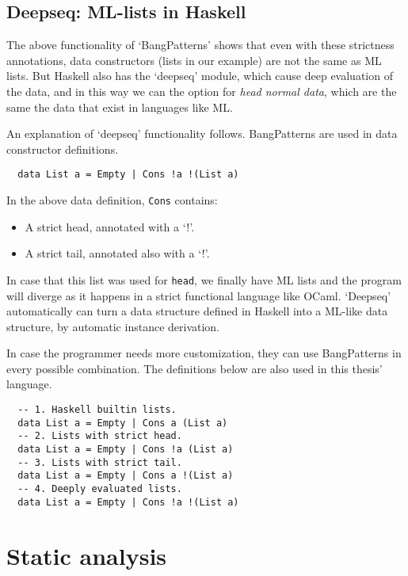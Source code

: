 \documentclass[diploma]{softlab-thesis}
\begin{document}
\subsection{Deepseq: ML-lists in Haskell}
\label{sec:deepseq}

The above functionality of `BangPatterns' shows that even with these strictness annotations, data constructors (lists in our
example) are not the same as ML lists. But Haskell also has the `deepseq' module, which cause deep evaluation of the data, 
and in this way we can the option for \textit{head normal data}, which are the same the data that 
exist in languages like ML. 

An explanation of `deepseq' functionality follows. BangPatterns are used in data constructor definitions.

\begin{verbatim}
  data List a = Empty | Cons !a !(List a)
\end{verbatim}

\noindent In the above data definition, \texttt{Cons} contains:
\begin{itemize}
  \item A strict head, annotated with a `!'.
  \item A strict tail, annotated also with a `!'.
\end{itemize}

In case that this list was used for \texttt{head}, we finally have ML lists and the program 
will diverge as it happens in a strict functional language like OCaml. `Deepseq' automatically can turn a data structure
defined in Haskell into a ML-like data structure, by automatic instance derivation.

In case the programmer needs more customization, they can use BangPatterns in every possible combination. 
The definitions below are also used in this thesis' language.
\begin{verbatim}
  -- 1. Haskell builtin lists.
  data List a = Empty | Cons a (List a) 
  -- 2. Lists with strict head.
  data List a = Empty | Cons !a (List a)
  -- 3. Lists with strict tail.
  data List a = Empty | Cons a !(List a)
  -- 4. Deeply evaluated lists. 
  data List a = Empty | Cons !a !(List a)
\end{verbatim}

\section {Static analysis}
\label{sec:static-analysis}
\end{document}
